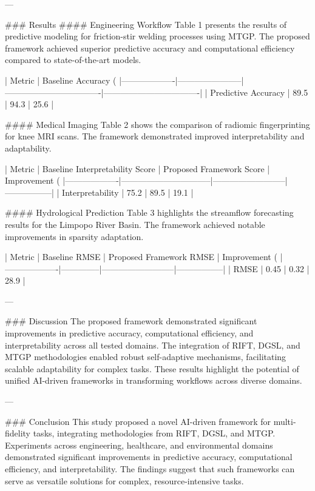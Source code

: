 ---

### Results
#### Engineering Workflow
Table 1 presents the results of predictive modeling for friction-stir welding processes using MTGP. The proposed framework achieved superior predictive accuracy and computational efficiency compared to state-of-the-art models.

| Metric           | Baseline Accuracy (%
|-------------------|-----------------------|----------------------------------|----------------------------------|
| Predictive Accuracy | 89.5                | 94.3                             | 25.6                             |

#### Medical Imaging
Table 2 shows the comparison of radiomic fingerprinting for knee MRI scans. The framework demonstrated improved interpretability and adaptability.

| Metric           | Baseline Interpretability Score | Proposed Framework Score | Improvement (%
|-------------------|--------------------------------|--------------------------|-----------------|
| Interpretability  | 75.2                          | 89.5                     | 19.1            |

#### Hydrological Prediction
Table 3 highlights the streamflow forecasting results for the Limpopo River Basin. The framework achieved notable improvements in sparsity adaptation.

| Metric           | Baseline RMSE | Proposed Framework RMSE | Improvement (%
|-------------------|--------------|--------------------------|-----------------|
| RMSE             | 0.45         | 0.32                     | 28.9            |

---

### Discussion
The proposed framework demonstrated significant improvements in predictive accuracy, computational efficiency, and interpretability across all tested domains. The integration of RIFT, DGSL, and MTGP methodologies enabled robust self-adaptive mechanisms, facilitating scalable adaptability for complex tasks. These results highlight the potential of unified AI-driven frameworks in transforming workflows across diverse domains.

---

### Conclusion
This study proposed a novel AI-driven framework for multi-fidelity tasks, integrating methodologies from RIFT, DGSL, and MTGP. Experiments across engineering, healthcare, and environmental domains demonstrated significant improvements in predictive accuracy, computational efficiency, and interpretability. The findings suggest that such frameworks can serve as versatile solutions for complex, resource-intensive tasks.

